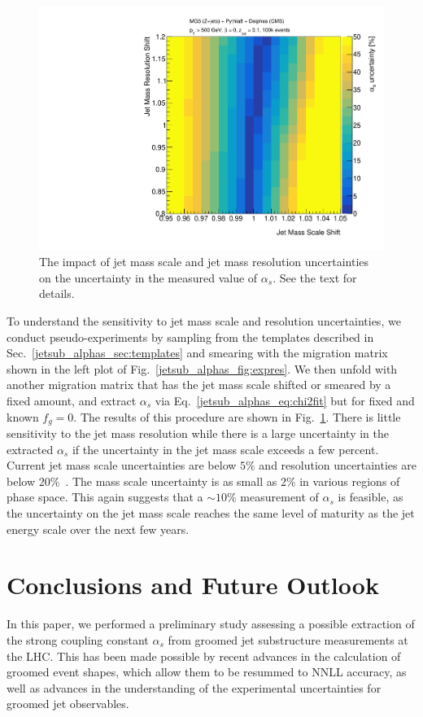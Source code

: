 \documentclass[11pt]{cernrep}
\begin{document}
\begin{figure}[t]
\begin{center}
\includegraphics[width = 0.49\columnwidth]{jetsub_alphas_resolution_scan.pdf}
\end{center}
\caption{The impact of jet mass scale and jet mass resolution uncertainties on the uncertainty in the measured value of $\alpha_s$.  See the text for details.}
\label{jetsub_alphas_fig:expfit}
\end{figure}

To understand the sensitivity to jet mass scale and resolution uncertainties, we conduct pseudo-experiments by sampling from the templates described in Sec.~\ref{jetsub_alphas_sec:templates} and smearing with the migration matrix shown in the left plot of Fig.~\ref{jetsub_alphas_fig:expres}.
%
We then unfold with another migration matrix that has the jet mass scale shifted or smeared by a fixed amount, and extract $\alpha_s$ via Eq.~\ref{jetsub_alphas_eq:chi2fit} but for fixed and known $f_g=0$.
%
The results of this procedure are shown in Fig.~\ref{jetsub_alphas_fig:expfit}.
%
There is little sensitivity to the jet mass resolution while there is a large uncertainty in the extracted $\alpha_s$ if the uncertainty in the jet mass scale exceeds a few percent.
%
Current jet mass scale uncertainties are below $5\%$ and resolution uncertainties are below 20\%~\cite{ATLAS-CONF-2017-063,CMS-PAS-JME-16-003}.
%
The mass scale uncertainty is as small as $2\%$ in various regions of phase space.
%
This again suggests that a $\sim 10\%$ measurement of $\alpha_s$ is feasible, as the uncertainty on the jet mass scale reaches the same level of maturity as the jet energy scale over the next few years.

\section{Conclusions and Future Outlook}
\label{jetsub_alphas_sec:future}

In this paper, we performed a preliminary study assessing a possible extraction of the strong coupling constant $\alpha_s$ from groomed jet substructure measurements at the LHC.
%
This has been made possible by recent advances in the calculation of groomed event shapes, which allow them to be resummed to NNLL accuracy, as well as advances in the understanding of the experimental uncertainties for groomed jet observables.
 
\end{document}
